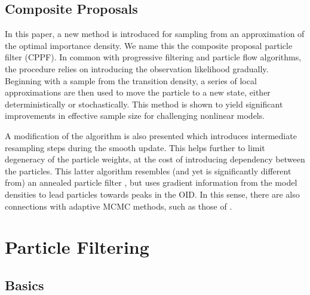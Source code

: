 \documentclass{article}
\begin{document}
\subsection{Composite Proposals}

In this paper, a new method is introduced for sampling from an approximation of the optimal importance density. We name this the composite proposal particle filter (CPPF). In common with progressive filtering and particle flow algorithms, the procedure relies on introducing the observation likelihood gradually. Beginning with a sample from the transition density, a series of local approximations are then used to move the particle to a new state, either deterministically or stochastically. This method is shown to yield significant improvements in effective sample size for challenging nonlinear models.

A modification of the algorithm is also presented which introduces intermediate resampling steps during the smooth update. This helps further to limit degeneracy of the particle weights, at the cost of introducing dependency between the particles. This latter algorithm resembles (and yet is significantly different from) an annealed particle filter \citep{Gall2007,Deutscher2000}, but uses gradient information from the model densities to lead particles towards peaks in the OID. In this sense, there are also connections with adaptive MCMC methods, such as those of \citep{Girolami2011}.



\section{Particle Filtering}

\subsection{Basics}\label{sec:pf_basics}
\end{document}
